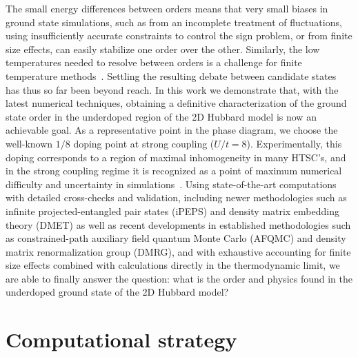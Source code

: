 \documentclass[12pt]{article}
\begin{document}
The small energy differences between orders means that very small biases in ground state simulations, such as from an incomplete
treatment of fluctuations, using insufficiently accurate constraints to control the
sign problem, or from finite size effects, 
can easily stabilize one order over the other. Similarly, the low temperatures needed to resolve between orders is a challenge for
 finite temperature methods~\cite{white1989numerical,wu2016controlling}.
Settling the resulting debate between candidate states  has thus so far been beyond reach.
In this work %
we demonstrate  that, with the latest numerical techniques, obtaining a
definitive characterization of the ground state order in the underdoped
region of the 2D Hubbard model is now an achievable goal. As a representative
point in the phase diagram, we choose the well-known $1/8$ doping point at strong
coupling ($U/t=8$). Experimentally, this doping corresponds to a region of maximal
inhomogeneity in many HTSC's, and in the strong coupling regime it is
recognized as a point of maximum numerical difficulty and uncertainty in
simulations~\cite{LeBlanc2015}.  
Using state-of-the-art computations with
detailed cross-checks and validation, including newer methodologies such as infinite projected-entangled pair states
(iPEPS) and density matrix embedding theory (DMET) as well as recent developments in
established methodologies such as constrained-path auxiliary field quantum Monte Carlo
(AFQMC) and density matrix renormalization group (DMRG), and with exhaustive accounting for finite size effects combined
with calculations directly in the thermodynamic limit, we are able
to %
finally answer the question: what is the order and physics found in the underdoped ground state of the 2D
Hubbard model? 

\section*{Computational strategy}
\end{document}
